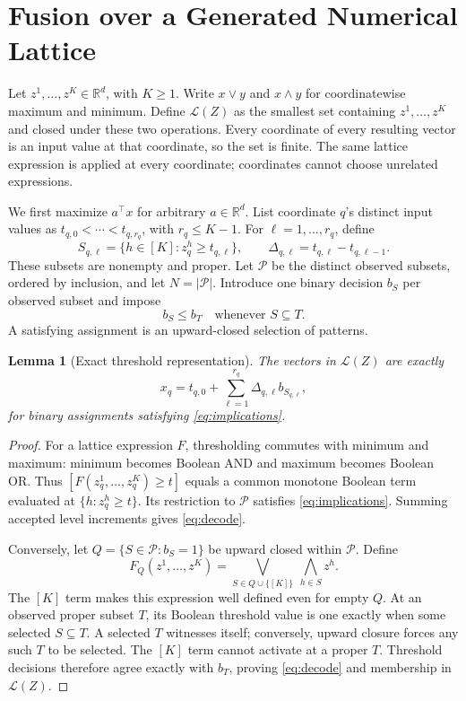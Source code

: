 \documentclass[10pt,letterpaper]{article}
\newtheorem{lemma}[theorem]{Lemma}
\newcommand{\R}{\mathbb{R}}
\newcommand{\lat}{\mathcal{L}}
\newcommand{\pat}{\mathcal{P}}
\begin{document}
\section{Fusion over a Generated Numerical Lattice}
Let $z^1,\ldots,z^K\in\R^d$, with $K\geq1$. Write $x\vee y$ and $x\wedge y$ for coordinatewise maximum and minimum. Define $\lat(Z)$ as the smallest set containing $z^1,\ldots,z^K$ and closed under these two operations. Every coordinate of every resulting vector is an input value at that coordinate, so the set is finite. The same lattice expression is applied at every coordinate; coordinates cannot choose unrelated expressions.

We first maximize $a^\top x$ for arbitrary $a\in\R^d$. List coordinate $q$'s distinct input values as $t_{q,0}<\cdots<t_{q,r_q}$, with $r_q\leq K-1$. For $\ell=1,\ldots,r_q$, define
\begin{equation}
 S_{q,\ell}=\{h\in[K]:z^h_q\geq t_{q,\ell}\},\qquad
 \Delta_{q,\ell}=t_{q,\ell}-t_{q,\ell-1}.
 \label{eq:patterns}
\end{equation}
These subsets are nonempty and proper. Let $\pat$ be the distinct observed subsets, ordered by inclusion, and let $N=|\pat|$. Introduce one binary decision $b_S$ per observed subset and impose
\begin{equation}
 b_S\leq b_T\quad\text{whenever }S\subseteq T.
 \label{eq:implications}
\end{equation}
A satisfying assignment is an upward-closed selection of patterns.

\begin{lemma}[Exact threshold representation]
The vectors in $\lat(Z)$ are exactly
\begin{equation}
 x_q=t_{q,0}+\sum_{\ell=1}^{r_q}\Delta_{q,\ell}b_{S_{q,\ell}},
 \label{eq:decode}
\end{equation}
for binary assignments satisfying \eqref{eq:implications}.
\label{lem:representation}
\end{lemma}
\begin{proof}
For a lattice expression $F$, thresholding commutes with minimum and maximum: minimum becomes Boolean AND and maximum becomes Boolean OR. Thus $[F(z^1_q,\ldots,z^K_q)\geq t]$ equals a common monotone Boolean term evaluated at $\{h:z^h_q\geq t\}$. Its restriction to $\pat$ satisfies \eqref{eq:implications}. Summing accepted level increments gives \eqref{eq:decode}.

Conversely, let $Q=\{S\in\pat:b_S=1\}$ be upward closed within $\pat$. Define
\begin{equation}
 F_Q(z^1,\ldots,z^K)
 =\bigvee_{S\in Q\cup\{[K]\}}\ \bigwedge_{h\in S}z^h.
 \label{eq:dnf}
\end{equation}
The $[K]$ term makes this expression well defined even for empty $Q$. At an observed proper subset $T$, its Boolean threshold value is one exactly when some selected $S\subseteq T$. A selected $T$ witnesses itself; conversely, upward closure forces any such $T$ to be selected. The $[K]$ term cannot activate at a proper $T$. Threshold decisions therefore agree exactly with $b_T$, proving \eqref{eq:decode} and membership in $\lat(Z)$.
\end{proof}
\end{document}
